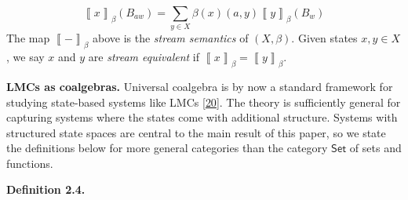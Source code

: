 \documentclass[11pt,a4paper]{amsart}
\begin{document}
\hypertarget{html:S2.Ex2.m1}{}\[\left\llbracket{x}\right\rrbracket_{\beta}(B_{aw})=\sum_{y\in X}\beta(x)(a,y)\left\llbracket{y}\right\rrbracket_{\beta}(B_{w})\]      %
\hypertarget{html:S2.SS0.SSS0.P0.SPx2.p4}{} The map %
\hypertarget{html:S2.SS0.SSS0.P0.SPx2.p4.m1}{}\({\left\llbracket{-}\right\rrbracket_{\beta}}\) above is the \emph{stream semantics} of %
\hypertarget{html:S2.SS0.SSS0.P0.SPx2.p4.m2}{}\({(X,\beta)}\). Given states %
\hypertarget{html:S2.SS0.SSS0.P0.SPx2.p4.m3}{}\({x,y\in X}\), we say %
\hypertarget{html:S2.SS0.SSS0.P0.SPx2.p4.m4}{}\({x}\) and %
\hypertarget{html:S2.SS0.SSS0.P0.SPx2.p4.m5}{}\({y}\) are \emph{stream equivalent} if %
\hypertarget{html:S2.SS0.SSS0.P0.SPx2.p4.m6}{}\({\left\llbracket{x}\right\rrbracket_{\beta}=\left\llbracket{y}\right\rrbracket_{\beta}}\).
\par\medskip
\hypertarget{html:S2.SS0.SSS0.P0.SPx3}{} \par\noindent\textbf{LMCs as coalgebras.}\quad  %
\hypertarget{html:S2.SS0.SSS0.P0.SPx3.p1}{} Universal coalgebra is by now a standard framework for studying state-based systems like LMCs [\hyperlink{html:bib.bib20}{20}]. The theory is sufficiently general for capturing systems where the states come with additional structure. Systems with structured state spaces are central to the main result of this paper, so we state the definitions below for more general categories than the category %
\hypertarget{html:S2.SS0.SSS0.P0.SPx3.p1.m1}{}\({\mathsf{Set}}\) of sets and functions.
\par\medskip
\hypertarget{html:S2.Thmtheorem4}{} \par\noindent\textbf{\textbf{Definition 2.4}\textbf{.}}\quad  %
\end{document}
